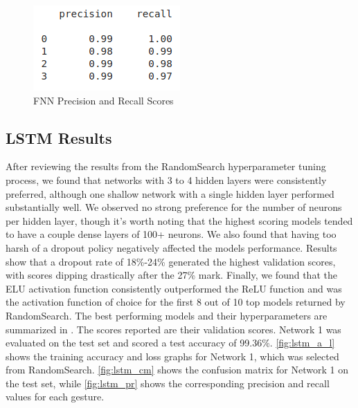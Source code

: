 \documentclass[journal]{IEEEtran}
\begin{document}
	\begin{figure}[!t]
		\centering
		\includegraphics[width=0.46\linewidth]{FFNN_prec_rec}
		\caption{FNN Precision and Recall Scores}
		\label{fig:fnn_pr}
	\end{figure}
	
	\subsection{LSTM Results}
	After reviewing the results from the RandomSearch hyperparameter tuning process, we found that networks with 3 to 4 hidden layers were consistently preferred, although one shallow network with a single hidden layer performed substantially well. We observed no strong preference for the number of neurons per hidden layer, though it’s worth noting that the highest scoring models tended to have a couple dense layers of 100+ neurons. We also found that having too harsh of a dropout policy negatively affected the models performance. Results show that a dropout rate of 18\%-24\% generated the highest validation scores, with scores dipping drastically after the 27\% mark. Finally, we found that the ELU activation function consistently outperformed the ReLU function and was the activation function of choice for the first 8 out of 10 top models returned by RandomSearch. The best performing models and their hyperparameters are summarized in . The scores reported are their validation scores. Network 1 was evaluated on the test set and scored a test accuracy of 99.36\%. \cref{fig:lstm_a_l} shows the training accuracy and loss graphs for Network 1, which was selected from RandomSearch. \cref{fig:lstm_cm} shows the confusion matrix for Network 1 on the test set, while \cref{fig:lstm_pr} shows the corresponding precision and recall values for each gesture. 
	
\end{document}
